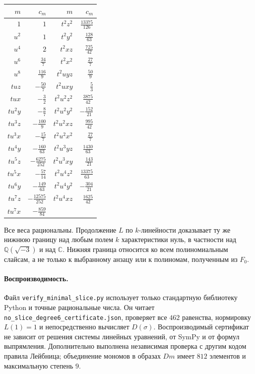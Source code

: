 \begin{center}
\renewcommand{\arraystretch}{1.25}
\begin{tabular}{r r | r r}
$m$ & $c_m$ & $m$ & $c_m$ \\
\hline
$1$ & $1$ & $t^{2}z^{2}$ & $\frac{13375}{126}$ \\
$u^{2}$ & $1$ & $t^{2}y^{2}$ & $\frac{128}{63}$ \\
$u^{4}$ & $2$ & $t^{2}xz$ & $\frac{725}{42}$ \\
$u^{6}$ & $\frac{34}{7}$ & $t^{2}x^{2}$ & $\frac{27}{7}$ \\
$u^{8}$ & $\frac{116}{9}$ & $t^{2}uyz$ & $\frac{50}{9}$ \\
$tuz$ & $-\frac{50}{7}$ & $t^{2}uxy$ & $\frac{5}{3}$ \\
$tux$ & $-\frac{3}{2}$ & $t^{2}u^{2}z^{2}$ & $\frac{3875}{42}$ \\
$tu^{2}y$ & $-\frac{8}{7}$ & $t^{2}u^{2}y^{2}$ & $-\frac{152}{21}$ \\
$tu^{3}z$ & $-\frac{100}{9}$ & $t^{2}u^{2}xz$ & $\frac{995}{42}$ \\
$tu^{3}x$ & $-\frac{15}{7}$ & $t^{2}u^{2}x^{2}$ & $\frac{27}{7}$ \\
$tu^{4}y$ & $-\frac{160}{63}$ & $t^{2}u^{3}yz$ & $\frac{1430}{63}$ \\
$tu^{5}z$ & $-\frac{6275}{252}$ & $t^{2}u^{3}xy$ & $\frac{143}{21}$ \\
$tu^{5}x$ & $-\frac{57}{14}$ & $t^{2}u^{4}z^{2}$ & $\frac{13375}{63}$ \\
$tu^{6}y$ & $-\frac{149}{63}$ & $t^{2}u^{4}y^{2}$ & $-\frac{304}{21}$ \\
$tu^{7}z$ & $-\frac{12575}{252}$ & $t^{2}u^{4}xz$ & $\frac{1625}{42}$ \\
$tu^{7}x$ & $-\frac{859}{84}$ &  &  \\
\end{tabular}
\end{center}

Все веса рациональны. Продолжение $L$ по $k$-линейности доказывает ту же
нижнюю границу над любым полем $k$ характеристики нуль, в частности
над $\mathbb Q(\sqrt{-3})$ и над $\mathbb C$.
Нижняя граница относится ко всем полиномиальным слайсам, а не только
к выбранному анзацу или к полиномам, полученным из $F_0$.

\paragraph{Воспроизводимость.}
Файл \texttt{verify\_minimal\_slice.py} использует только стандартную
библиотеку Python и точные рациональные числа. Он читает
\texttt{no\_slice\_degree6\_certificate.json}, проверяет все $462$ равенства,
нормировку $L(1)=1$ и непосредственно вычисляет $D(\sigma)$.
Воспроизводимый сертификат не зависит от решения системы линейных
уравнений, от SymPy и от формул выпрямления. Дополнительно выполнена
независимая проверка с другим кодом правила Лейбница; объединение
мономов в образах $Dm$ имеет $812$ элементов и максимальную степень $9$.

